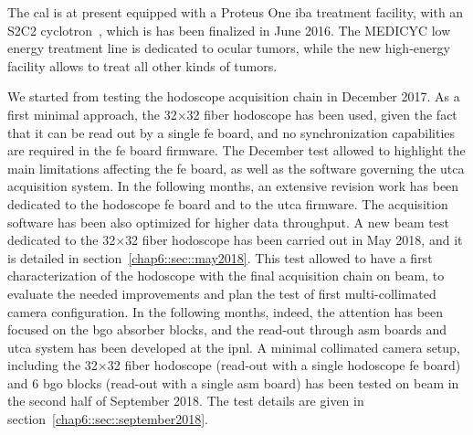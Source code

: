 The \gls{cal} is at present equipped with a Proteus One \gls{iba} treatment facility, with an S2C2 cyclotron~\parencite{Pearson2013}, which is has been finalized in June 2016. The MEDICYC low energy treatment line is dedicated to ocular tumors, while the new high-energy facility allows to treat all other kinds of tumors.

We started from testing the hodoscope acquisition chain in December 2017. As a first minimal approach, the 32$\times$32 fiber hodoscope has been used, given the fact that it can be read out by a single \gls{fe} board, and no synchronization capabilities are required in the \gls{fe} board firmware. The December test allowed to highlight the main limitations affecting the \gls{fe} board, as well as the software governing the \gls{utca} acquisition system.
In the following months, an extensive revision work has been dedicated to the hodoscope \gls{fe} board and to the \gls{utca} firmware. The acquisition software has been also optimized for higher data throughput.  
A new beam test dedicated to the 32$\times$32 fiber hodoscope has been carried out in May 2018, and it is detailed in section~\ref{chap6::sec::may2018}. This test allowed to have a first characterization of the hodoscope with the final acquisition chain on beam, to evaluate the needed improvements and plan the test of first multi-collimated camera configuration. In the following months, indeed, the attention has been focused on the \gls{bgo} absorber blocks, and the read-out through \gls{asm} boards and  \gls{utca} system has been developed at the \gls{ipnl}. A minimal collimated camera setup, including the 32$\times$32 fiber hodoscope (read-out with a single hodoscope \gls{fe} board) and 6 \gls{bgo} blocks (read-out with a single \gls{asm} board) has been tested on beam in the second half of September 2018. The test details are given in section~\ref{chap6::sec::september2018}. 
 
